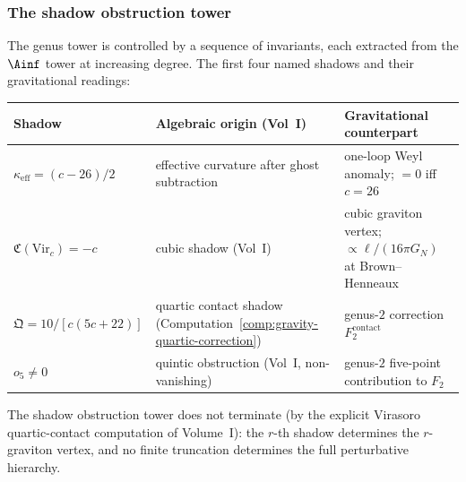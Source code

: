 \subsubsection*{The shadow obstruction tower}

The genus tower is controlled by a sequence of invariants,
each extracted from the $\Ainf$ tower at increasing degree.
The first four named shadows and their gravitational readings:

\begin{center}
\small
\renewcommand{\arraystretch}{1.15}
\begin{tabular}{lll}
\textbf{Shadow} & \textbf{Algebraic origin (Vol~I)} & \textbf{Gravitational counterpart} \\
\hline
$\kappa_{\mathrm{eff}} = (c-26)/2$
 & effective curvature after ghost subtraction
 & one-loop Weyl anomaly; $= 0$ iff $c = 26$ \\[2pt]
$\mathfrak{C}(\mathrm{Vir}_c) = -c$
 & cubic shadow (Vol~I)
 & cubic graviton vertex; $\propto \ell/(16\pi G_N)$ at Brown--Henneaux \\[2pt]
$\mathfrak{Q} = 10/[c(5c+22)]$
 & quartic contact shadow (Computation~\ref{comp:gravity-quartic-correction})
 & genus-$2$ correction $F_2^{\mathrm{contact}}$ \\[2pt]
$o_5 \ne 0$
 & quintic obstruction (Vol~I, non-vanishing)
 & genus-$2$ five-point contribution to $F_2$
\end{tabular}
\end{center}

The shadow obstruction tower does not terminate
(by the explicit Virasoro quartic-contact computation of Volume~I):
the $r$-th shadow determines the $r$-graviton
vertex, and no finite
truncation determines the full perturbative hierarchy.

